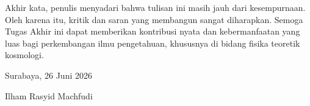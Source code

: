 \noindent Akhir kata, penulis menyadari bahwa tulisan ini masih jauh dari kesempurnaan. Oleh karena itu, kritik dan saran yang membangun sangat diharapkan. Semoga Tugas Akhir ini dapat memberikan kontribusi nyata dan kebermanfaatan yang luas bagi perkembangan ilmu pengetahuan, khususnya di bidang fisika teoretik kosmologi.

\vspace{5em}

\begin{flushright}
    Surabaya, 26 Juni 2026
    
    \vspace{2.5cm}
    
    Ilham Rasyid Machfudi
\end{flushright}